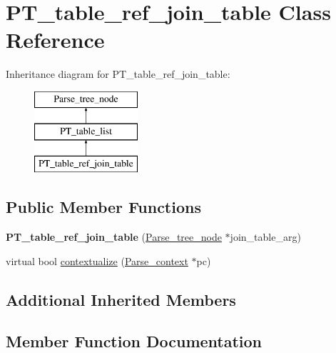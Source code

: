 \hypertarget{classPT__table__ref__join__table}{}\section{P\+T\+\_\+table\+\_\+ref\+\_\+join\+\_\+table Class Reference}
\label{classPT__table__ref__join__table}
Inheritance diagram for P\+T\+\_\+table\+\_\+ref\+\_\+join\+\_\+table\+:\begin{figure}[H]
\begin{center}
\leavevmode
\includegraphics[height=3.000000cm]{classPT__table__ref__join__table}
\end{center}
\end{figure}
\subsection*{Public Member Functions}
\begin{DoxyCompactItemize}
\item 
\mbox{\label{classPT__table__ref__join__table_a3d9c79f1e5299a3adccf3b4eb7102157}} 
{\bfseries P\+T\+\_\+table\+\_\+ref\+\_\+join\+\_\+table} (\mbox{\hyperlink{classParse__tree__node}{Parse\+\_\+tree\+\_\+node}} $\ast$join\+\_\+table\+\_\+arg)
\item 
virtual bool \mbox{\hyperlink{classPT__table__ref__join__table_a07f1fb12ec92cbbe014951e4c277e792}{contextualize}} (\mbox{\hyperlink{structParse__context}{Parse\+\_\+context}} $\ast$pc)
\end{DoxyCompactItemize}
\subsection*{Additional Inherited Members}


\subsection{Member Function Documentation}
\mbox{\label{classPT__table__ref__join__table_a07f1fb12ec92cbbe014951e4c277e792}} 
